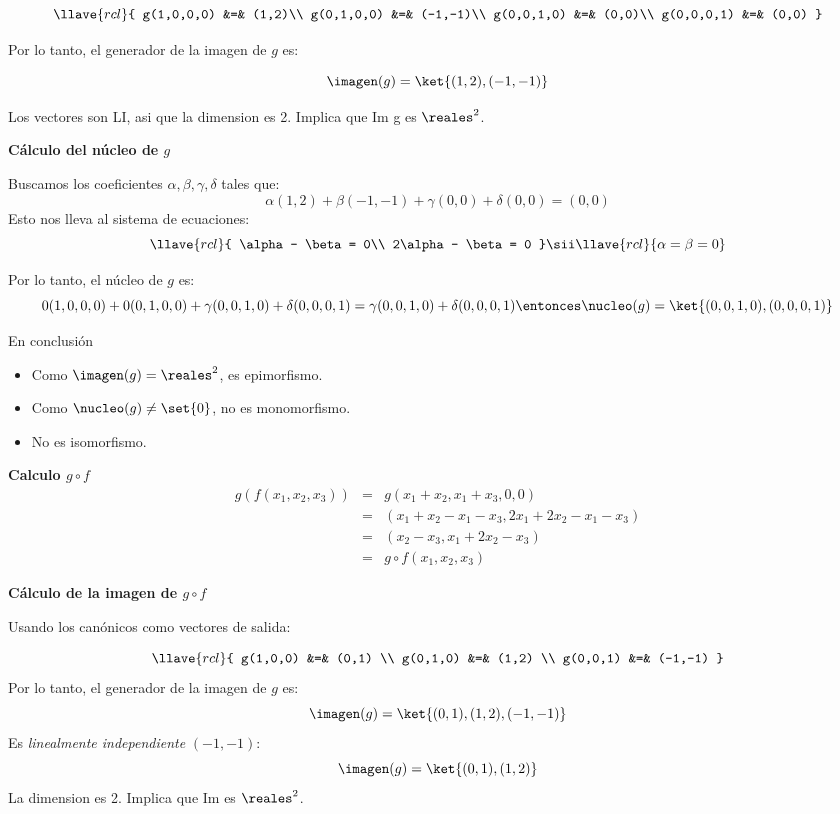 $$
  \llave{rcl}{
    g(1,0,0,0) &=& (1,2)\\
    g(0,1,0,0) &=& (-1,-1)\\
    g(0,0,1,0) &=& (0,0)\\
    g(0,0,0,1) &=& (0,0)
  }
$$

Por lo tanto, el generador de la imagen de $ g $ es:

$$ \imagen(g) = \ket{(1,2), (-1,-1)} $$

Los vectores son LI, asi que la dimension es 2. Implica que Im g es $ \reales^2 $.

\medskip

\textbf{Cálculo del núcleo de $g$}

Buscamos los coeficientes $ \alpha, \beta, \gamma, \delta $ tales que:
$$
  \alpha(1,2) + \beta(-1,-1) + \gamma(0,0) + \delta(0,0) = (0,0)
$$
Esto nos lleva al sistema de ecuaciones:
$$
  \llave{rcl}{
    \alpha - \beta = 0\\
    2\alpha - \beta = 0
  }
  \sii
  \llave{rcl}{
    \alpha = \beta = 0
  }
$$

Por lo tanto, el núcleo de $g$ es:
$$
  0(1,0,0,0) + 0(0,1,0,0) + \gamma(0,0,1,0) + \delta(0,0,0,1) = \gamma(0,0,1,0) + \delta(0,0,0,1)
  \entonces
  \nucleo(g) = \ket{(0,0,1,0), (0,0,0,1)}
$$

En conclusión
\begin{itemize}
  \item Como $ \imagen(g) = \reales^2 $, es epimorfismo.
  \item Como $ \nucleo(g) \neq \set{0} $, no es monomorfismo.
  \item No es isomorfismo.
\end{itemize}

\textbf{Calculo $ g\circ f $}
$$
  \begin{array}{rcl}
    g(f(x_1,x_2,x_3)) & = & g(x_1+x_2,x_1+x_3,0,0)              \\
                      & = & (x_1+x_2-x_1-x_3,2x_1+2x_2-x_1-x_3) \\
                      & = & (x_2-x_3,x_1+2x_2-x_3)              \\
                      & = & g\circ f (x_1,x_2,x_3)
  \end{array}
$$

\textbf{Cálculo de la imagen de $ g\circ f $}

Usando los canónicos como vectores de salida:

$$
  \llave{rcl}{
    g(1,0,0) &=& (0,1) \\
    g(0,1,0) &=& (1,2) \\
    g(0,0,1) &=& (-1,-1)
  }
$$
Por lo tanto, el generador de la imagen de $ g $ es:
$$
  \imagen(g) = \ket{(0,1), (1,2), (-1,-1)}
$$
Es \textit{linealmente independiente} $(-1,-1)$:
$$
  \imagen(g) = \ket{(0,1), (1,2)}
$$
La dimension es 2. Implica que Im es $ \reales^2 $.

